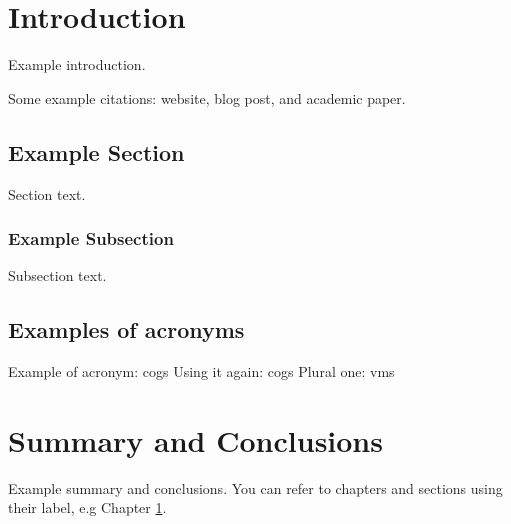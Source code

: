\documentclass{UIdahoMastersThesis}
\begin{document}
	
	
	\mainmatter  %
	\setcounter{secnumdepth}{3}  %
	
	
	
	
	\clearpage
	\chapter{Introduction}
	\label{Chapter:Introduction}
	
	Example introduction. 
	
	Some example citations: website\cite{apache}, blog post\cite{lambert2015}, and academic paper\cite{Barham-2003}.  %
	
	\section{Example Section}
	Section text.
	\subsection{Example Subsection}
	Subsection text. 
	
	
	\section{Examples of acronyms}
	Example of acronym: \ac{cogs}
	Using it again: \ac{cogs}
	Plural one: \acp{vm}
	
	
	
	
	\chapter{Summary and Conclusions}
	\label{Chapter:SummaryAndConclusions}
	
	Example summary and conclusions. You can refer to chapters and sections using their label, e.g Chapter \ref{Chapter:Introduction}.
	
	
	
\end{document}
